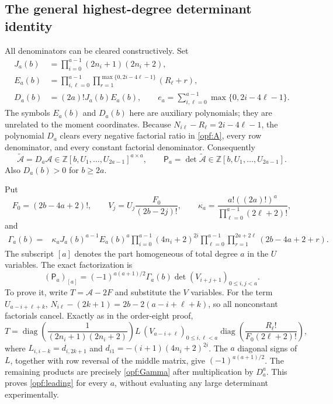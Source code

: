 \subsection{The general highest-degree determinant identity}

All denominators can be cleared constructively. Set
\begin{align*}
 J_a(b)&=\prod_{i=0}^{a-1}(2n_i+1)(2n_i+2),\\
 E_a(b)&=\prod_{i,\ell=0}^{a-1}
           \prod_{r=1}^{\max\{0,2i-4\ell-1\}}(R_\ell+r),\\
 D_a(b)&=(2a)!J_a(b)E_a(b),\qquad
 e_a=\sum_{i,\ell=0}^{a-1}\max\{0,2i-4\ell-1\}.
\end{align*}
The symbols $E_a(b)$ and $D_a(b)$ here are auxiliary polynomials;
they are unrelated to the moment coordinates.
Because $N_{i\ell}-R_\ell=2i-4\ell-1$, the polynomial $D_a$
clears every negative factorial ratio in \eqref{opf:A}, every
row denominator, and every constant factorial denominator.
Consequently
\[
 \widetilde{\mathcal A}=D_a\mathcal A
       \in\mathbb Z[b,U_1,\ldots,U_{2a-1}]^{a\times a},
 \qquad \mathsf P_a=\det\widetilde{\mathcal A}
       \in\mathbb Z[b,U_1,\ldots,U_{2a-1}].
\]
Also $D_a(b)>0$ for $b\ge2a$.

Put
\[
 F_0=(2b-4a+2)!,\qquad
 V_j=U_j\frac{F_0}{(2b-2j)!},\qquad
 \kappa_a=\frac{a!((2a)!)^a}{\prod_{\ell=0}^{a-1}(2\ell+2)!},
\]
and
\begin{align}
 \Gamma_a(b)={}&\kappa_aJ_a(b)^{a-1}E_a(b)^a
 \prod_{i=0}^{a-1}(4n_i+2)^{\underline{2i}}
 \prod_{\ell=0}^{a-1}\prod_{r=1}^{2a+2\ell}(2b-4a+2+r).
 \label{opf:Gamma}
\end{align}
The subscript $[a]$ denotes the part homogeneous of total degree
$a$ in the $U$ variables. The exact factorization is
\begin{equation}\label{opf:leading}
 (\mathsf P_a)_{[a]}
 =(-1)^{a(a+1)/2}\Gamma_a(b)
           \det(V_{i+j+1})_{0\le i,j<a}.
\end{equation}
To prove it, write $T=\mathcal A-2F$ and substitute the $V$ variables.
For the term $U_{a-i+\ell+k}$,
$N_{i\ell}-(2k+1)=2b-2(a-i+\ell+k)$, so all nonconstant
factorials cancel. Exactly as in the order-eight proof,
\[
 T=\operatorname{diag}\!\left(\frac1{(2n_i+1)(2n_i+2)}\right)
    L\,(V_{a-i+\ell})_{0\le i,\ell<a}
    \operatorname{diag}\!\left(\frac{R_\ell!}{F_0(2\ell+2)!}\right),
\]
where $L_{i,i-k}=d_{i,2k+1}$ and
$d_{i1}=-(i+1)(4n_i+2)^{\underline{2i}}$.
The $a$ diagonal signs of $L$, together with row reversal of the
middle matrix, give $(-1)^{a(a+1)/2}$. The remaining products are
precisely \eqref{opf:Gamma} after multiplication by $D_a^a$.
This proves \eqref{opf:leading} for every $a$, without evaluating
any large determinant experimentally.

